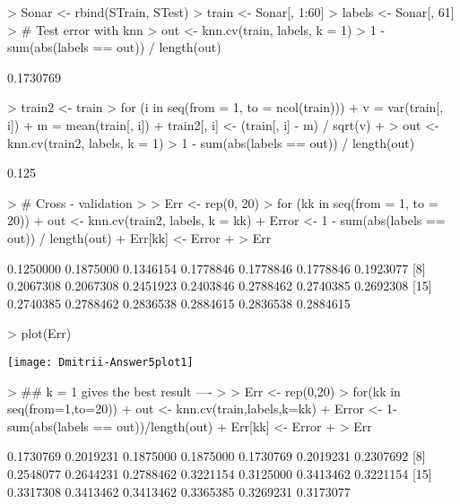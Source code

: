 \documentclass{article}
\begin{document}
\begin{Schunk}
\begin{Sinput}
> Sonar <- rbind(STrain, STest)
> train <- Sonar[, 1:60]
> labels <- Sonar[, 61]
> # Test error with knn
> out <- knn.cv(train, labels, k = 1)
> 1 - sum(abs(labels == out)) / length(out)
\end{Sinput}
\begin{Soutput}
[1] 0.1730769
\end{Soutput}
\begin{Sinput}
> train2 <- train
> for (i in seq(from = 1, to = ncol(train))) {
+   v = var(train[, i])
+   m = mean(train[, i])
+   train2[, i] <- (train[, i] - m) / sqrt(v)
+ }
> out <- knn.cv(train2, labels, k = 1)
> 1 - sum(abs(labels == out)) / length(out)
\end{Sinput}
\begin{Soutput}
[1] 0.125
\end{Soutput}
\begin{Sinput}
> # Cross - validation
> 
> Err <- rep(0, 20)
> for (kk in seq(from = 1, to = 20)) {
+   out <- knn.cv(train2, labels, k = kk)
+   Error <- 1 - sum(abs(labels == out)) / length(out)
+   Err[kk] <- Error
+ }
> Err
\end{Sinput}
\begin{Soutput}
 [1] 0.1250000 0.1875000 0.1346154 0.1778846 0.1778846 0.1778846 0.1923077
 [8] 0.2067308 0.2067308 0.2451923 0.2403846 0.2788462 0.2740385 0.2692308
[15] 0.2740385 0.2788462 0.2836538 0.2884615 0.2836538 0.2884615
\end{Soutput}
\end{Schunk}
\begin{Schunk}
\begin{Sinput}
> plot(Err)
\end{Sinput}
\end{Schunk}
\texttt{[image: Dmitrii-Answer5plot1]}
\begin{Schunk}
\begin{Sinput}
> ## k = 1 gives the best result ----
> 
> Err <- rep(0,20)
> for(kk in seq(from=1,to=20)){
+   out <- knn.cv(train,labels,k=kk)
+   Error <- 1-sum(abs(labels == out))/length(out)
+   Err[kk] <- Error   
+ }
> Err
\end{Sinput}
\begin{Soutput}
 [1] 0.1730769 0.2019231 0.1875000 0.1875000 0.1730769 0.2019231 0.2307692
 [8] 0.2548077 0.2644231 0.2788462 0.3221154 0.3125000 0.3413462 0.3221154
[15] 0.3317308 0.3413462 0.3413462 0.3365385 0.3269231 0.3173077
\end{Soutput}
\end{Schunk}
\end{document}
